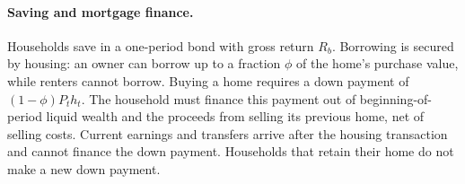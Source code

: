 \paragraph{Saving and mortgage finance.}
Households save in a one-period bond with gross return $R_b$. Borrowing is
secured by housing: an owner can borrow up to a fraction $\phi$ of the
home's purchase value, while renters cannot borrow. Buying a home requires
a down payment of $(1-\phi)P_t h_t$. The household must finance this payment
out of beginning-of-period liquid wealth and the proceeds from selling its
previous home, net of selling costs. Current earnings and transfers arrive
after the housing transaction and cannot finance the down payment.
Households that retain their home do not make a new down payment.
